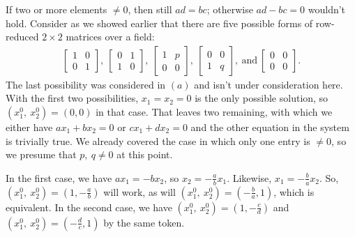 \documentclass[12pt]{article}
\begin{document}
\begin{enumerate}
\begin{enumerate}
          If two or more elements $\neq 0$, then still $ad = bc$;
          otherwise $ad - bc = 0$ wouldn't hold. Consider as we
          showed earlier that there are five possible forms of
          row-reduced $2 \times 2$ matrices over a field:
          \begin{align*}
            \begin{bmatrix}
               1 & 0\\
               0 & 1
            \end{bmatrix},\ 
            \begin{bmatrix}
               0 & 1\\
               1 & 0
            \end{bmatrix},\ 
            \begin{bmatrix}
               1 & p\\
               0 & 0
            \end{bmatrix},\ 
            \begin{bmatrix}
               0 & 0\\
               1 & q
            \end{bmatrix},\ \text{and}\ 
            \begin{bmatrix}
               0 & 0\\
               0 & 0
            \end{bmatrix}.
          \end{align*}
          The last possibility was considered in $(a)$ and isn't
          under consideration here. With the first two
          possibilities, $x_1 = x_2 = 0$ is the only possible
          solution, so $(x_{1}^{0},\ x_{2}^{0}) = (0,0)$ in that
          case. That leaves two remaining, with which we either
          have $ax_1 + bx_2 = 0$ or $cx_1 + dx_2 = 0$ and the
          other equation in the system is trivially true. We
          already covered the case in which only one entry is
          $\neq 0$, so we presume that $p,\ q \neq 0$ at this
          point.

          In the first case, we have $ax_1 = -bx_2$, so $x_2 =
          -\frac{a}{b}x_1$. Likewise, $x_1 = -\frac{b}{a}x_2$.
          So, $(x_{1}^{0},\ x_{2}^{0}) = (1,-\frac{a}{b})$ will
          work, as will $(x_{1}^{0},\ x_{2}^{0}) =
          (-\frac{b}{a},1)$, which is equivalent. In the second
          case, we have $(x_{1}^{0},\ x_{2}^{0}) =
          (1,-\frac{c}{d})$ and $(x_{1}^{0},\ x_{2}^{0}) =
          (-\frac{d}{c},1)$ by the same token.


\end{enumerate}
\end{enumerate}
\end{document}
